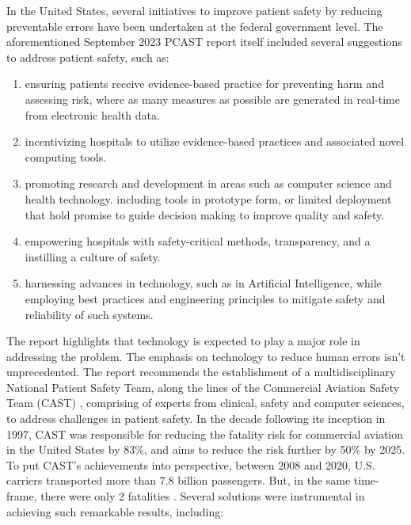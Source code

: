 In the United States, several initiatives to improve patient safety by
reducing preventable errors have been undertaken at the federal government
level. The aforementioned September 2023 PCAST report itself included several suggestions to
address patient safety, such as:
\begin{enumerate}[label=(\roman*)]
  \item ensuring patients receive evidence-based practice for preventing
    harm and assessing risk, where as many measures as possible are
    generated in real-time from electronic health data.
  \item incentivizing hospitals to utilize evidence-based practices
    and associated novel computing tools.
  \item promoting research and development in areas such as
    computer science and health technology.
    including tools in prototype form, or limited deployment that
    hold promise to guide decision making to improve quality and safety.
  \item empowering hospitals with safety-critical methods, transparency,
    and a instilling a culture of safety.
  \item harnessing advances in technology, such as in Artificial Intelligence,
    while employing best practices and engineering principles to mitigate safety
    and reliability of such systems.
\end{enumerate}
The report highlights that technology is expected to play a major role in
addressing the problem. The emphasis on technology to reduce human errors
isn't unprecedented. The report recommends the establishment of a
multidisciplinary National Patient Safety Team, along the lines of
the Commercial Aviation Safety Team (CAST) \cite{CASTUrl}, comprising of
experts from clinical, safety and computer sciences, to address challenges
in patient safety. In the decade following its inception in 1997,
CAST was responsible for reducing the fatality risk for commercial aviation
in the United States by 83\%, and aims to reduce the risk further by 50\% by
2025. To put CAST's achievements into perspective, between 2008 and 2020,
U.S. carriers transported more than 7.8 billion passengers. But, in the same
time-frame, there were only 2 fatalities \cite{CASTSafetyReport20}.
Several solutions were instrumental in achieving such remarkable results, including:
